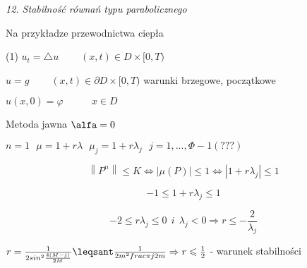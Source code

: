 \textit{12. Stabilność równań typu parabolicznego}

Na przykładze przewodnictwa ciepła

(1) $u_t = \bigtriangleup u\ \ \ \ \ \ \ \ \ \ (x,t) \in D \times [0,T)$

$u = g\ \ \ \ \ \ \ \ \ \ (x,t) \in \partial D \times [0,T)$ warunki brzegowe, początkowe

$u(x,0) = \varphi\ \ \ \ \ \ \ \ \ \ \ \ \ x \in D$

Metoda jawna $\alfa = 0$

$n = 1\ \ \ \mu = 1 + r \lambda\ \ \ \mu _j = 1 + r \lambda _j \ \ \ j = 1,...,\Phi - 1 (???)$

\[ \left \| P^n \right \| \leqslant K \Leftrightarrow \left | \mu (P) \right | \leqslant 1 \Leftrightarrow \left | 1 + r\lambda _j \right | \leqslant 1 \]

\[-1 \leqslant 1 + r \lambda _j \leqslant 1\]

\[-2 \leqslant r \lambda _j \leqslant 0\ \ i\ \ \lambda _j < 0 \Rightarrow r \leqslant - \frac{2}{\lambda _j} \]

$r = \frac{1}{2 sin^2 \frac{4(M-j)}{2M}} \leqsant \frac{1}{2m^2 frac{\pi j}{2m}} \Rightarrow r \leqslant \frac{1}{2}$ - warunek stabilności